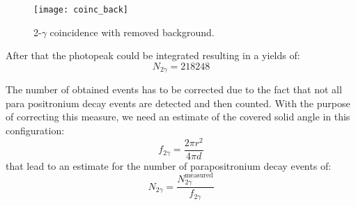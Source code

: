 \begin{figure}[H]
\centering
\texttt{[image: coinc\_back]}
\caption{2-$\gamma$ coincidence with removed background.}
\label{Fig: removed compton back}
\end{figure}

After that the photopeak could be integrated resulting in a yields of:
\begin{equation}
N_{2\gamma} = 218248
\end{equation} 

The number of obtained events has to be corrected due to the fact that not all para positronium decay events are detected and then counted. With the purpose of correcting this measure, we need an estimate of the covered solid angle in this configuration:
\begin{equation}
f_{2\gamma} = \dfrac{2\pi r^2}{4\pi d}
\end{equation}
that lead to an estimate for the number of parapositronium decay events of:
\begin{equation}
N_{2\gamma} = \dfrac{N_{2\gamma}^{\text{measured}}}{f_{2\gamma}}
\end{equation}




